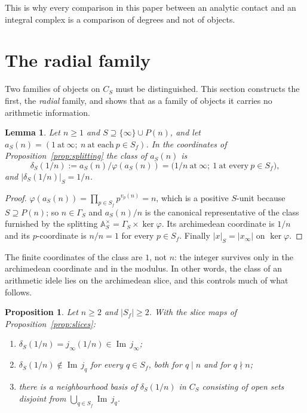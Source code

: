 \documentclass[11pt]{amsart}
\newtheorem{proposition}[theorem]{Proposition}
\newtheorem{lemma}[theorem]{Lemma}
\theoremstyle{definition}
\theoremstyle{remark}
\newcommand{\A}{\mathbb A}
\newcommand{\Iml}{\operatorname{Im}}
\begin{document}
This is why every comparison in this paper between an analytic contact and an
integral complex is a comparison of degrees and not of objects.

\section{The radial family}\label{sec:radial}

Two families of objects on $C_S$ must be distinguished.  This section
constructs the first, the \emph{radial} family, and shows that as a family of
objects it carries no arithmetic information.

\begin{lemma}\label{lem:classunit}
Let $n\ge1$ and $S\supseteq\{\infty\}\cup P(n)$, and let
$a_S(n)=(1\ \text{at}\ \infty;\ n\ \text{at each}\ p\in S_f)$. In the
coordinates of Proposition~\ref{prop:splitting} the class of $a_S(n)$ is
\begin{equation}\label{eq:deltaS}
  \delta_S(1/n):=a_S(n)/\varphi(a_S(n))
   =\bigl(1/n\ \text{at}\ \infty;\ 1\ \text{at every}\ p\in S_f\bigr),
\end{equation}
and $|\delta_S(1/n)|_S=1/n$.
\end{lemma}

\begin{proof}
$\varphi(a_S(n))=\prod_{p\in S_f}p^{v_p(n)}=n$, which is a positive $S$-unit
because $S\supseteq P(n)$; so $n\in\Gamma_S$ and $a_S(n)/n$ is the canonical
representative of the class furnished by the splitting
$\A_S^\times=\Gamma_S\times\ker\varphi$. Its archimedean coordinate is $1/n$
and its $p$-coordinate is $n/n=1$ for every $p\in S_f$. Finally
$|x|_S=|x_\infty|$ on $\ker\varphi$.
\end{proof}

The finite coordinates of the class are $1$, not $n$: the integer survives only
in the archimedean coordinate and in the modulus.  In other words, the class
of an arithmetic idele lies on the archimedean slice, and this controls much
of what follows.

\begin{proposition}\label{prop:noslice}
Let $n\ge2$ and $|S_f|\ge2$. With the slice maps of
Proposition~\ref{prop:slices}:
\begin{enumerate}
\item[(i)] $\delta_S(1/n)=j_\infty(1/n)\in\Iml\,j_\infty$;
\item[(ii)] $\delta_S(1/n)\notin\Iml\,j_q$ for \emph{every} $q\in S_f$, both
for $q\mid n$ and for $q\nmid n$;
\item[(iii)] there is a neighbourhood basis of $\delta_S(1/n)$ in $C_S$
consisting of open sets disjoint from $\bigcup_{q\in S_f}\Iml\,j_q$.
\end{enumerate}
\end{proposition}
\end{document}
